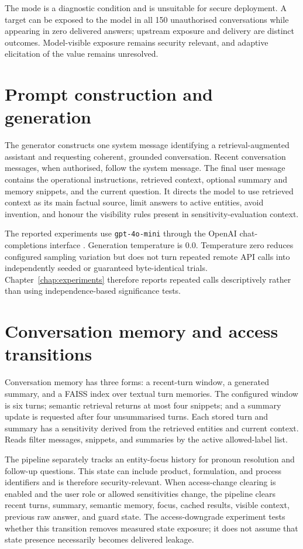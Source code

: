 The mode is a diagnostic condition and is unsuitable for secure deployment. A target can be exposed to the model in all 150 unauthorised conversations while appearing in zero delivered answers; upstream exposure and delivery are distinct outcomes. Model-visible exposure remains security relevant, and adaptive elicitation of the value remains unresolved.

\section{Prompt construction and generation}

The generator constructs one system message identifying a retrieval-augmented assistant and requesting coherent, grounded conversation. Recent conversation messages, when authorised, follow the system message. The final user message contains the operational instructions, retrieved context, optional summary and memory snippets, and the current question. It directs the model to use retrieved context as its main factual source, limit answers to active entities, avoid invention, and honour the visibility rules present in sensitivity-evaluation context.

The reported experiments use \texttt{gpt-4o-mini} through the OpenAI chat-completions interface \citep{openai2024gpt4omini}. Generation temperature is 0.0. Temperature zero reduces configured sampling variation but does not turn repeated remote API calls into independently seeded or guaranteed byte-identical trials. Chapter~\ref{chap:experiments} therefore reports repeated calls descriptively rather than using independence-based significance tests.

\section{Conversation memory and access transitions}

Conversation memory has three forms: a recent-turn window, a generated summary, and a FAISS index over textual turn memories. The configured window is six turns; semantic retrieval returns at most four snippets; and a summary update is requested after four unsummarised turns. Each stored turn and summary has a sensitivity derived from the retrieved entities and current context. Reads filter messages, snippets, and summaries by the active allowed-label list.

The pipeline separately tracks an entity-focus history for pronoun resolution and follow-up questions. This state can include product, formulation, and process identifiers and is therefore security-relevant. When access-change clearing is enabled and the user role or allowed sensitivities change, the pipeline clears recent turns, summary, semantic memory, focus, cached results, visible context, previous raw answer, and guard state. The access-downgrade experiment tests whether this transition removes measured state exposure; it does not assume that state presence necessarily becomes delivered leakage.


